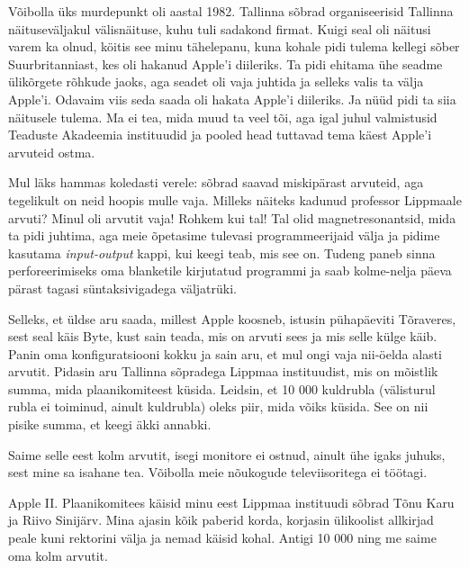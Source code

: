 Võibolla üks murdepunkt oli aastal 1982. Tallinna 
sõbrad organiseerisid Tallinna näituseväljakul välisnäituse, kuhu tuli sadakond firmat. Kuigi seal oli näitusi varem ka olnud, köitis see minu tähelepanu, kuna
kohale pidi tulema kellegi sõber 
Suurbritanniast, kes oli hakanud Apple'i diileriks. Ta pidi ehitama ühe seadme ülikõrgete rõhkude jaoks, 
aga seadet oli vaja juhtida ja selleks valis ta välja Apple'i. 
Odavaim viis seda saada oli hakata Apple'i diileriks. Ja nüüd pidi ta siia
näitusele tulema. Ma ei tea, mida muud ta veel tõi, aga igal juhul valmistusid
Teaduste Akadeemia instituudid ja pooled head 
tuttavad tema käest Apple'i arvuteid ostma. 

Mul läks hammas 
koledasti verele: sõbrad saavad miskipärast arvuteid, aga tegelikult on neid 
hoopis mulle vaja. Milleks näiteks kadunud professor Lippmaale arvuti? Minul oli arvutit vaja! Rohkem
kui tal! Tal olid magnetresonantsid, mida ta pidi juhtima, 
aga meie õpetasime tulevasi programmeerijaid välja ja pidime kasutama 
\emph{input-output} kappi, kui keegi teab, mis see on. Tudeng paneb sinna
perforeerimiseks oma blanketile kirjutatud programmi ja saab kolme-nelja päeva 
pärast tagasi süntaksivigadega väljatrüki. 

Selleks, et üldse aru saada, millest 
Apple koosneb, istusin pühapäeviti Tõraveres, 
sest seal käis Byte, kust sain teada, 
mis on arvuti sees ja mis selle külge käib. Panin oma konfiguratsiooni kokku ja sain aru, et mul ongi vaja nii-öelda
alasti arvutit. Pidasin aru Tallinna sõpradega Lippmaa 
instituudist, mis on 
mõistlik summa, mida plaanikomiteest küsida. Leidsin, et 10 000 kuldrubla (välisturul rubla 
ei toiminud, ainult kuldrubla) oleks piir, mida võiks küsida. See on 
nii pisike summa, et keegi äkki annabki. 

Saime selle eest kolm arvutit, isegi 
monitore ei ostnud, ainult ühe igaks juhuks, sest mine sa isahane tea. Võibolla meie 
nõukogude televiisoritega ei töötagi. 


Apple II. Plaanikomitees käisid minu eest Lippmaa 
instituudi sõbrad Tõnu Karu ja Riivo 
Sinijärv. Mina ajasin kõik paberid korda, korjasin 
ülikoolist allkirjad peale kuni rektorini välja ja nemad käisid kohal. Antigi 10 000 ning me saime oma kolm arvutit.

